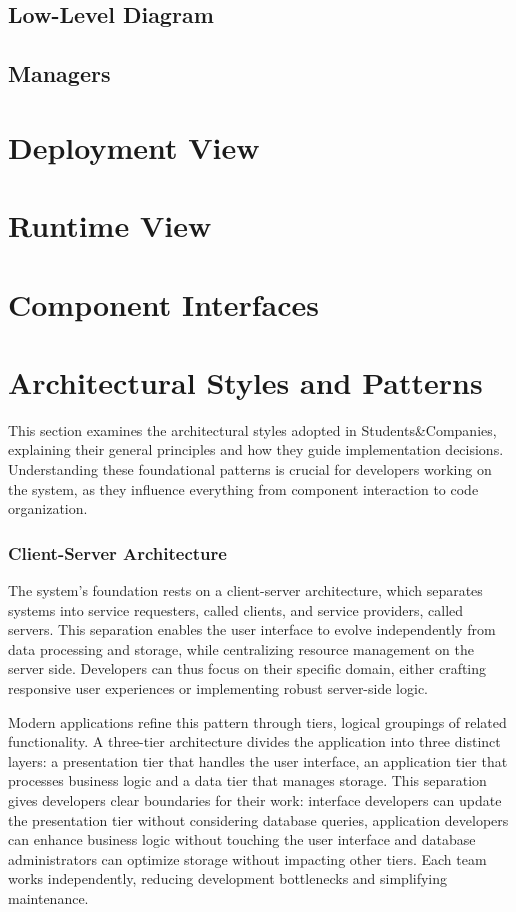 \subsection{Low-Level Diagram}
\subsection{Managers}
\section{Deployment View}
\section{Runtime View}
\section{Component Interfaces}
\section{Architectural Styles and Patterns}
This section examines the architectural styles adopted in Students\&Companies, explaining their general principles and how they guide implementation decisions.
Understanding these foundational patterns is crucial for developers working on the system, as they influence everything from component interaction to code organization.

\subsubsection{Client-Server Architecture}
The system's foundation rests on a client-server architecture, which separates systems into service requesters, called clients, and service providers, called servers.
This separation enables the user interface to evolve independently from data processing and storage, while centralizing resource management on the server side.
Developers can thus focus on their specific domain, either crafting responsive user experiences or implementing robust server-side logic.

Modern applications refine this pattern through tiers, logical groupings of related functionality.
A three-tier architecture divides the application into three distinct layers: a presentation tier that handles the user interface, an application tier that processes business logic and a data tier that manages storage.
This separation gives developers clear boundaries for their work: interface developers can update the presentation tier without considering database queries, application developers can enhance business logic without touching the user interface and database administrators can optimize storage without impacting other tiers.
Each team works independently, reducing development bottlenecks and simplifying maintenance.

